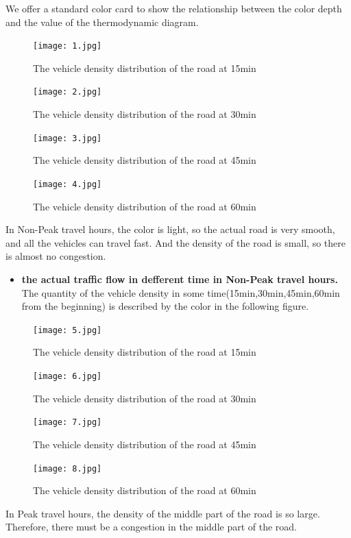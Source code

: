 \documentclass[UTF8]{mcmthesis}
\begin{document}
\indent We offer a standard color card to show the relationship between the color depth and the value of the thermodynamic diagram.

\begin{figure}[H]
	\centerline{\texttt{[image: 1.jpg]}}
	\caption{The vehicle density distribution of the road at 15min}	
\end{figure}
\begin{figure}[H]
	\centerline{\texttt{[image: 2.jpg]}}
	\caption{The vehicle density distribution of the road at 30min}	
\end{figure}
\begin{figure}[H]
	\centerline{\texttt{[image: 3.jpg]}}
	\caption{The vehicle density distribution of the road at 45min}	
\end{figure}
\begin{figure}[H]
	\centerline{\texttt{[image: 4.jpg]}}
	\caption{The vehicle density distribution of the road at 60min}	
\end{figure}
\indent\indent In Non-Peak travel hours, the color is light, so the actual road is very smooth, and all the vehicles can travel fast. And the density of the road is small, so there is almost no congestion.
\begin{itemize}
\item{\textbf{the actual traffic flow in defferent time in Non-Peak travel hours.}
 The quantity of the vehicle density in some time(15min,30min,45min,60min from the beginning) is described by the color in the following figure. }
\end{itemize}
\begin{figure}[H]
	\centerline{\texttt{[image: 5.jpg]}}
	\caption{The vehicle density distribution of the road at 15min}	
\end{figure}
\begin{figure}[H]
	\centerline{\texttt{[image: 6.jpg]}}
	\caption{The vehicle density distribution of the road at 30min}	
\end{figure}
\begin{figure}[H]
	\centerline{\texttt{[image: 7.jpg]}}
	\caption{The vehicle density distribution of the road at 45min}	
\end{figure}
\begin{figure}[H]
	\centerline{\texttt{[image: 8.jpg]}}
	\caption{The vehicle density distribution of the road at 60min}	
\end{figure}
\indent\indent In Peak travel hours, the density of the middle part of the road is so large. Therefore, there must be a congestion in the middle part of the road.
\end{document}

